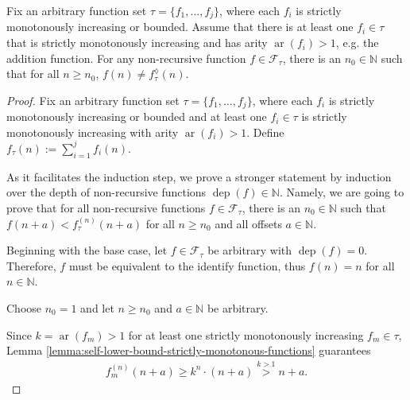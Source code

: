 \begin{theorem}
	\label{theorem:recursive-completion-not-non-recursive-expressible}
	Fix an arbitrary function set $\tau=\{f_1,\dots,f_j\}$, where each $f_i$ is strictly monotonously increasing or bounded. 
	Assume that there is at least one $f_i\in\tau$ that is strictly monotonously increasing and has arity $\operatorname{ar}(f_i)>1$, e.g. the addition function.
	For any non-recursive function $f\in\mathcal{F}_{\tau}$, there is an $n_0\in\mathbb{N}$ such that for all $n\geq n_0$, $f(n)\neq f_{\tau}^{\lozenge}(n)$.
\end{theorem}
\begin{proof}
	Fix an arbitrary function set $\tau=\{f_1,\dots,f_j\}$, where each $f_i$ is strictly monotonously increasing or bounded and at least one $f_i\in\tau$ is strictly monotonously increasing with arity $\operatorname{ar}(f_i)>1$. 
	Define $f_\tau(n):=\sum_{i=1}^{j}f_i(n)$.
	
	As it facilitates the induction step, we prove a stronger statement by induction over the depth of non-recursive functions $\operatorname{dep}(f)\in\mathbb{N}$.
	Namely, we are going to prove that for all non-recursive functions $f\in\mathcal{F}_{\tau}$, there is an $n_0\in\mathbb{N}$ such that $f(n+a)<f_{\tau}^{(n)}(n+a)$ for all $n\geq n_0$ and all offsets $a\in\mathbb{N}$.
	
	Beginning with the base case, let $f\in\mathcal{F}_{\tau}$ be arbitrary with $\operatorname{dep}(f)=0$.
	Therefore, $f$ must be equivalent to the identify function, thus $f(n)=n$ for all $n\in\mathbb{N}$.
	
	Choose $n_0=1$ and let $n\geq n_0$ and $a\in\mathbb{N}$ be arbitrary.
	
	Since $k=\operatorname{ar}(f_m)>1$ for at least one strictly monotonously increasing $f_m\in\tau$, Lemma \ref{lemma:self-lower-bound-strictly-monotonous-functions} guarantees
	\begin{align}
		\label{eq:theorem:recursive-completion-not-non-recursive-expressible-self-lower-bound}
		f_m^{(n)}(n+a) \geq k^n\cdot (n+a) \overset{k>1}{>} n+a.
	\end{align}
	
	

\end{proof}
